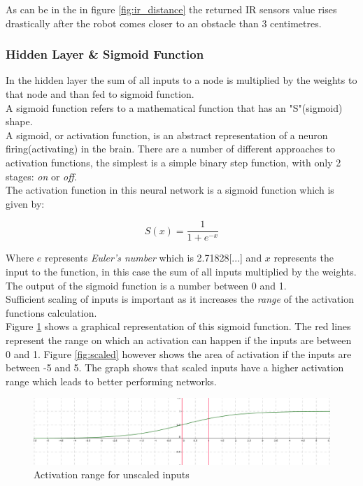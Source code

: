 
As can be in the in figure \ref{fig:ir_distance} the returned IR sensors value rises drastically after the robot comes closer to an obstacle than 3 centimetres. \\


\subsubsection{Hidden Layer \& Sigmoid Function}\label{sec:hiddenlayer}
In the hidden layer the sum of all inputs to a node is multiplied by the weights to that node and than fed to sigmoid function.\\

A sigmoid function refers to a mathematical function that has an "S"(sigmoid) shape.\\
A sigmoid, or activation function, is an abstract representation of a neuron firing(activating) in the brain. There are a number of different approaches to activation functions, the simplest is a simple binary step function, with only 2 stages: \textit{on} or \textit{off}.\\
The activation function in this neural network is a sigmoid function which is given by:

\begin{equation}
S(x) = \frac{1}{1 + e^{-x}}
\end{equation} 

Where $e$ represents \textit{Euler's number} which is 2.71828[...] and $x$ represents the input to the function, in this case the sum of all inputs multiplied by the weights.\\
The output of the sigmoid function is a number between 0 and 1.\\

Sufficient scaling of inputs is important as it increases the \textit{range} of the activation functions calculation. \\
Figure  \ref{fig:unscaled} shows a graphical representation of  this sigmoid function. The red lines represent the range on which an activation can happen if the inputs are between 0 and 1. Figure \ref{fig:scaled} however shows the area of activation if the inputs are between -5 and 5. The graph shows that scaled inputs have a higher activation range which leads to better performing networks. 

\begin{figure}[h]
\begin{center}
\includegraphics[scale=0.4]{Chapter2/images/unscaled.PNG}
\caption{Activation range for unscaled inputs}
\label{fig:unscaled}
\end{center}
\end{figure}

